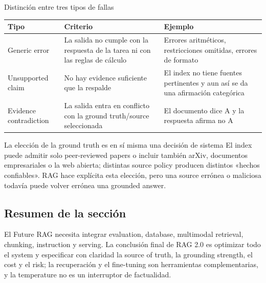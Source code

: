 \begin{importantbox}{Distinción entre tres tipos de fallas}
\begin{tabularx}{\textwidth}{L{0.20\textwidth}>{\raggedright\arraybackslash}X >{\raggedright\arraybackslash}X}
\toprule
Tipo & Criterio & Ejemplo \\
\midrule
Generic error & La salida no cumple con la respuesta de la tarea ni con las reglas de cálculo & Errores aritméticos, restricciones omitidas, errores de formato \\
Unsupported claim & No hay evidence suficiente que la respalde & El index no tiene fuentes pertinentes y aun así se da una afirmación categórica \\
Evidence contradiction & La salida entra en conflicto con la ground truth/source seleccionada & El documento dice A y la respuesta afirma no A \\
\bottomrule
\end{tabularx}
\end{importantbox}

\begin{warningbox}{La elección de la ground truth es en sí misma una decisión de sistema}
El index puede admitir solo peer-reviewed papers o incluir también arXiv, documentos empresariales o la web abierta; distintas source policy producen distintos «hechos confiables». RAG hace explícita esta elección, pero una source errónea o maliciosa todavía puede volver errónea una grounded answer.
\end{warningbox}



\subsection{Resumen de la sección}

El Future RAG necesita integrar evaluation, database, multimodal retrieval, chunking, instruction y serving. La conclusión final de RAG 2.0 es optimizar todo el system y especificar con claridad la source of truth, la grounding strength, el cost y el risk; la recuperación y el fine-tuning son herramientas complementarias, y la temperature no es un interruptor de factualidad.
